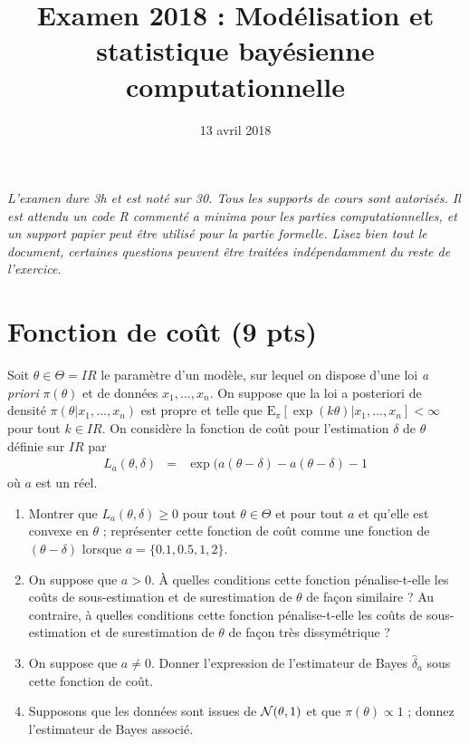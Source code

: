 \documentclass[10pt]{article}
\title{Examen 2018 : Modélisation et statistique bayésienne computationnelle }
\date{13 avril 2018}
\newcommand{\R}{I\!\!R}
\newcommand{\E}{\mbox{E}}
\newcommand{\1}{\mathbbm{1}}
\begin{document}
\maketitle

 




{\it L'examen dure 3h et est noté sur 30. Tous les supports de cours sont autorisés. Il est attendu un code R commenté {\it a minima} pour les parties computationnelles, et un support papier peut être utilisé pour la partie formelle. Lisez bien tout le document, certaines questions peuvent être traitées indépendamment du reste de l'exercice.} \\


\section{Fonction de coût (9 pts) }

Soit $\theta\in\Theta=\R$ le paramètre d'un modèle, sur lequel on dispose d'une loi {\it a priori} $\pi(\theta)$ et de données $x_1,\ldots,x_n$. On suppose que la loi a posteriori de densité  $\pi(\theta|x_1,\ldots,x_n)$ est propre et telle que $\E_{\pi}[\exp(k\theta)|x_1,\ldots,x_n]<\infty$ pour tout $k\in\R$. On considère la fonction de coût pour l'estimation $\delta$ de $\theta$ définie sur $\R$ par
\begin{eqnarray*}
L_a(\theta,\delta) & = & \exp(a(\theta-\delta) - a(\theta-\delta) - 1
\end{eqnarray*}
où $a$ est un réel.
\begin{enumerate}
\item Montrer que $L_a(\theta,\delta)\geq 0$ pour tout $\theta\in\Theta$ et pour tout $a$ et qu'elle est convexe en $\theta$ ; représenter cette fonction de coût comme une fonction de $(\theta-\delta)$ lorsque $a=\{0.1, 0.5, 1,2\}$. 
\item On suppose que $a>0$. \`A quelles conditions cette fonction pénalise-t-elle les coûts de sous-estimation et de surestimation de $\theta$ de fa\c con similaire ? Au contraire, à quelles conditions cette fonction pénalise-t-elle les coûts de sous-estimation et de surestimation de $\theta$ de fa\c con très dissymétrique ? 
\item On suppose que $a\neq 0$. Donner l'expression de l'estimateur de Bayes $\hat{\delta}_a$ sous cette fonction de coût.
\item Supposons que les données sont issues de ${\cal{N}}(\theta,1)$ et que $\pi(\theta)\propto 1$ ; donnez l'estimateur de Bayes associé.
\end{enumerate}
\end{document}
